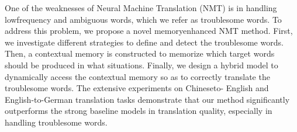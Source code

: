One of the weaknesses of Neural Machine Translation (NMT) is in handling lowfrequency and ambiguous words, which we refer as troublesome words. To address this problem, we propose a novel memoryenhanced NMT method. First, we investigate different strategies to define and detect the troublesome words. Then, a contextual memory is constructed to memorize which target words should be produced in what situations. Finally, we design a hybrid model to dynamically access the contextual memory so as to correctly translate the troublesome words. The extensive experiments on Chineseto- English and English-to-German translation tasks demonstrate that our method significantly outperforms the strong baseline models in translation quality, especially in handling troublesome words.
